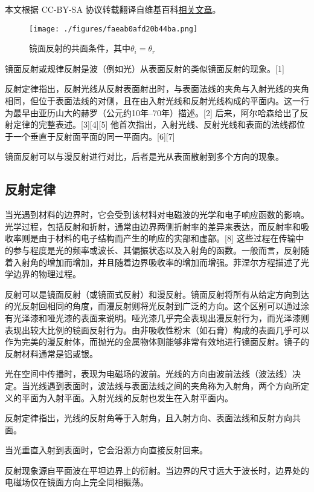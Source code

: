 
本文根据 CC-BY-SA 协议转载翻译自维基百科\href{https://en.wikipedia.org/wiki/Specular_reflection}{相关文章}。

\begin{figure}[ht]
\centering
\texttt{[image: ./figures/faeab0afd20b44ba.png]}
\caption{镜面反射的共面条件，其中\(\theta_i = \theta_r\)} \label{fig_JMFS_1}
\end{figure}
镜面反射或规律反射是波（例如光）从表面反射的类似镜面反射的现象。[1]

反射定律指出，反射光线从反射表面射出时，与表面法线的夹角与入射光线的夹角相同，但位于表面法线的对侧，且在由入射光线和反射光线构成的平面内。这一行为最早由亚历山大的赫罗（公元约10年–70年）描述。[2] 后来，阿尔哈森给出了反射定律的完整表述。[3][4][5] 他首次指出，入射光线、反射光线和表面的法线都位于一个垂直于反射面平面的同一平面内。[6][7]

镜面反射可以与漫反射进行对比，后者是光从表面散射到多个方向的现象。
\subsection{反射定律}
当光遇到材料的边界时，它会受到该材料对电磁波的光学和电子响应函数的影响。光学过程，包括反射和折射，通常由边界两侧折射率的差异来表达，而反射率和吸收率则是由于材料的电子结构而产生的响应的实部和虚部。[8] 这些过程在传输中的参与程度是光的频率或波长、其偏振状态以及入射角的函数。一般而言，反射随着入射角的增加而增加，并且随着边界吸收率的增加而增强。菲涅尔方程描述了光学边界的物理过程。

反射可以是镜面反射（或镜面式反射）和漫反射。镜面反射将所有从给定方向到达的光反射回相同的角度，而漫反射则将光反射到广泛的方向。这个区别可以通过涂有光泽漆和哑光漆的表面来说明。哑光漆几乎完全表现出漫反射行为，而光泽漆则表现出较大比例的镜面反射行为。由非吸收性粉末（如石膏）构成的表面几乎可以作为完美的漫反射体，而抛光的金属物体则能够非常有效地进行镜面反射。镜子的反射材料通常是铝或银。

光在空间中传播时，表现为电磁场的波前。光线的方向由波前法线（波法线）决定。当光线遇到表面时，波法线与表面法线之间的夹角称为入射角，两个方向所定义的平面为入射平面。入射光线的反射也发生在入射平面内。

反射定律指出，光线的反射角等于入射角，且入射方向、表面法线和反射方向共面。

当光垂直入射到表面时，它会沿源方向直接反射回来。

反射现象源自平面波在平坦边界上的衍射。当边界的尺寸远大于波长时，边界处的电磁场仅在镜面方向上完全同相振荡。
